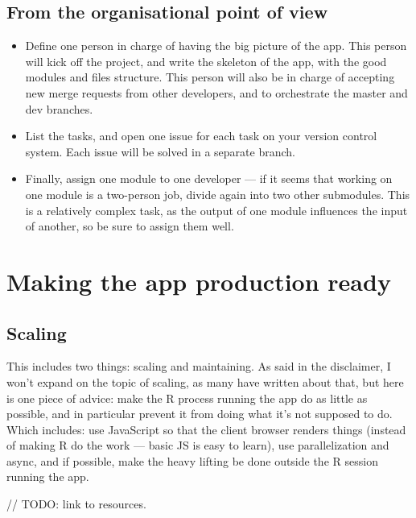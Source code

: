 \documentclass[]{book}
\providecommand{\tightlist}{%
  \setlength{\itemsep}{0pt}\setlength{\parskip}{0pt}}
\begin{document}
\hypertarget{from-the-organisational-point-of-view}{%
\subsection{From the organisational point of view}\label{from-the-organisational-point-of-view}}

\begin{itemize}
\tightlist
\item
  Define one person in charge of having the big picture of the app. This person will kick off the project, and write the skeleton of the app, with the good modules and files structure. This person will also be in charge of accepting new merge requests from other developers, and to orchestrate the master and dev branches.
\item
  List the tasks, and open one issue for each task on your version control system. Each issue will be solved in a separate branch.
\item
  Finally, assign one module to one developer --- if it seems that working on one module is a two-person job, divide again into two other submodules. This is a relatively complex task, as the output of one module influences the input of another, so be sure to assign them well.
\end{itemize}

\hypertarget{making-the-app-production-ready}{%
\section{Making the app production ready}\label{making-the-app-production-ready}}

\hypertarget{scaling}{%
\subsection{Scaling}\label{scaling}}

This includes two things: scaling and maintaining. As said in the disclaimer, I won't expand on the topic of scaling, as many have written about that, but here is one piece of advice: make the R process running the app do as little as possible, and in particular prevent it from doing what it's not supposed to do. Which includes: use JavaScript so that the client browser renders things (instead of making R do the work --- basic JS is easy to learn), use parallelization and async, and if possible, make the heavy lifting be done outside the R session running the app.

// TODO: link to resources.
\end{document}
